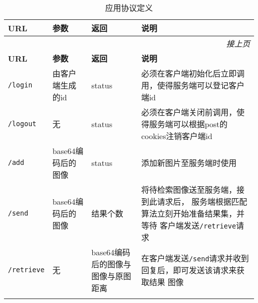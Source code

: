 
\begin{center}
    \begin{longtable}{| l | p{2.5cm} | p{2.5cm} | p{5cm} |}
    \hline
    \textbf{URL} & \textbf{参数} & \textbf{返回} & \textbf{说明} \\
    \hline
    \endfirsthead
    \multicolumn{4}{r}{\textit{接上页}} \\
    \hline
    \textbf{URL} & \textbf{参数} & \textbf{返回} & \textbf{说明} \\
    \hline
    \endhead
    \hline
    \endfoot
    \endlastfoot
    \texttt{/login}
  & 由客户端生成的id
  & status
  & 必须在客户端初始化后立即调用，使得服务端可以登记客户端id \\
    \hline
    \texttt{/logout}
  & 无
  & status
  & 必须在客户端关闭前调用，使得服务端可以根据post的cookies注销客户端id \\
    \hline
    \texttt{/add}
  & base64编码后的图像
  & status
  & 添加新图片至服务端时使用 \\
    \hline
    \texttt{/send}
  & base64编码后的图像
  & 结果个数
  & 将待检索图像送至服务端，接到此请求后，
    服务端根据匹配算法立刻开始准备结果集，并等待
    客户端发送\texttt{/retrieve}请求 \\
    \hline
    \texttt{/retrieve}
  & 无
  & base64编码后的图像与图像与原图距离
  & 在客户端发送\texttt{/send}请求并收到回复后，即可发送该请求来获取结果
    图像 \\
    \hline
  \caption{应用协议定义} \\
  \end{longtable}
  \label{tab:app-proto-def}
\end{center}


